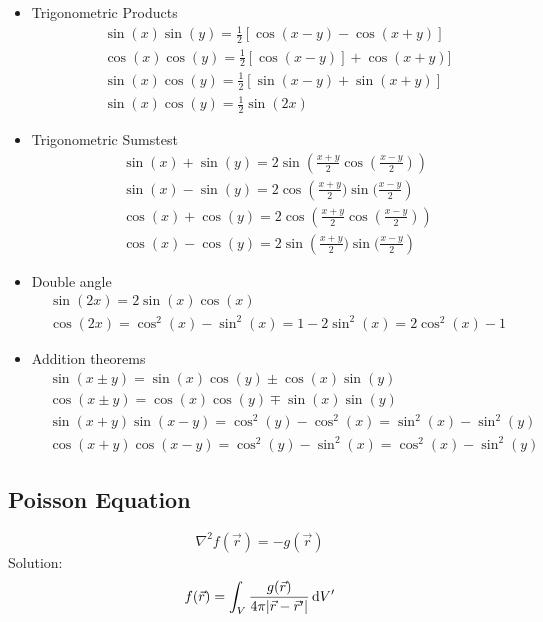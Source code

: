 \documentclass[a4paper, fontsize=8pt, landscape, DIV=1]{scrartcl}
\begin{document}
\begin{multicols*}{4}
\begin{itemize}
    \item Trigonometric Products
    {\small\begin{align*}
      & \sin(x)\sin(y) = \frac{1}{2}[\cos(x-y) - \cos(x+y)] \\
      &\cos(x)\cos(y) = \frac{1}{2}[\cos(x-y)] + \cos(x+y)] \\
      & \sin(x)\cos(y) = \frac{1}{2}[\sin(x-y) + \sin(x+y)] \\
      &\sin(x)\cos(y) = \frac{1}{2}\sin(2x)
    \end{align*}}%

    \item Trigonometric Sumstest
    {\small\begin{align*}
      & \sin(x) + \sin(y) = 2\sin\left(\frac{x+y}{2}\cos(\frac{x-y}{2})\right)\\
      & \sin(x)-\sin(y) = 2\cos\left(\frac{x+y}{2})\sin(\frac{x-y}{2}\right) \\
      & \cos(x) + \cos(y) = 2\cos\left(\frac{x+y}{2}\cos(\frac{x-y}{2})\right)\\
      & \cos(x)-\cos(y) = 2\sin\left(\frac{x+y}{2})\sin(\frac{x-y}{2}\right)
    \end{align*}}%

    \item Double angle
    {\small\begin{align*}
      & \sin(2x) = 2\sin(x)\cos(x) \\
      & \cos(2x) = \cos^2(x)-\sin^2(x) = 1-2\sin^2(x) = 2\cos^2(x) - 1
    \end{align*}}%

    \item Addition theorems
    {\small\begin{align*}
      & \sin(x\pm y) = \sin(x)\cos(y) \pm \cos(x)\sin(y) \\
      & \cos(x\pm y) = \cos(x)\cos(y) \mp \sin(x)\sin(y) \\
      & \sin(x+y)\sin(x-y) = \cos^2(y)-\cos^2(x) = \sin^2(x) - \sin^2(y)\\
      & \cos(x+y)\cos(x-y) = \cos^2(y)-\sin^2(x) = \cos^2(x) - \sin^2(y)
    \end{align*}}%
  \end{itemize}

  \subsection{Poisson Equation}
    \[\nabla^2f(\vec{r}) = -g(\vec{r})\]
    Solution:
    \[f(\vec{r}) = \int_V \frac{g(\vec{r})}{4\pi|\vec{r}-\vec{r}'|} \,\mathrm{d} V'\]

  
  \vfill\null
  \columnbreak
  \end{multicols*}
\end{document}
